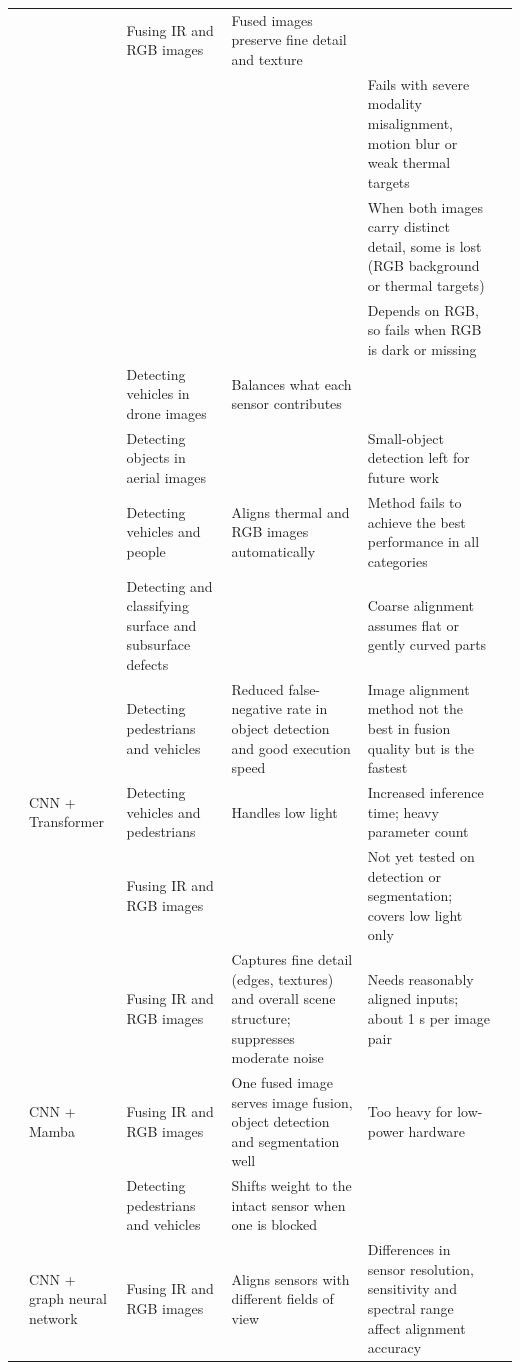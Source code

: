{\begin{xltabular}{\textwidth}{>{\RaggedRight\arraybackslash}p{1.6cm}>{\RaggedRight\arraybackslash}p{2.2cm}>{\RaggedRight\arraybackslash}p{2.3cm}>{\RaggedRight\arraybackslash}X>{\RaggedRight\arraybackslash}Xp{0.95cm}}
 &  & Fusing IR and RGB images & Fused images preserve fine detail and texture &  & \citep{Gao2026} \\
 &  &  &  & Fails with severe modality misalignment, motion blur or weak thermal targets & \citep{Zhu2026} \\
 &  &  &  & When both images carry distinct detail, some is lost (RGB background or thermal targets) & \citep{Lin2026} \\
 &  &  &  & Depends on RGB, so fails when RGB is dark or missing & \citep{Xiao2026} \\
 &  & Detecting vehicles in drone images & Balances what each sensor contributes &  & \citep{Tang2026} \\
 &  & Detecting objects in aerial images &  & Small-object detection left for future work & \citep{Liu2025a} \\
 &  & Detecting vehicles and people & Aligns thermal and RGB images automatically & Method fails to achieve the best performance in all categories & \citep{Liu2025} \\
 &  & Detecting and classifying surface and subsurface defects &  & Coarse alignment assumes flat or gently curved parts & \citep{Li2024c} \\
 &  & Detecting pedestrians and vehicles & Reduced false-negative rate in object detection and good execution speed & Image alignment method not the best in fusion quality but is the fastest & \citep{Lin2022} \\
 & CNN + Transformer & Detecting vehicles and pedestrians & Handles low light & Increased inference time; heavy parameter count & \citep{Jiang2024} \\
 &  & Fusing IR and RGB images &  & Not yet tested on detection or segmentation; covers low light only & \citep{An2026} \\
 &  & Fusing IR and RGB images & Captures fine detail (edges, textures) and overall scene structure; suppresses moderate noise & Needs reasonably aligned inputs; about 1 s per image pair & \citep{Xu2026} \\
 & CNN + Mamba & Fusing IR and RGB images & One fused image serves image fusion, object detection and segmentation well & Too heavy for low-power hardware & \citep{Chen2026a} \\
 &  & Detecting pedestrians and vehicles & Shifts weight to the intact sensor when one is blocked &  & \citep{Wang2026b} \\
 & CNN + graph neural network & Fusing IR and RGB images & Aligns sensors with different fields of view & Differences in sensor resolution, sensitivity and spectral range affect alignment accuracy & \citep{Shahsavarani2024} \\

\end{xltabular}}
